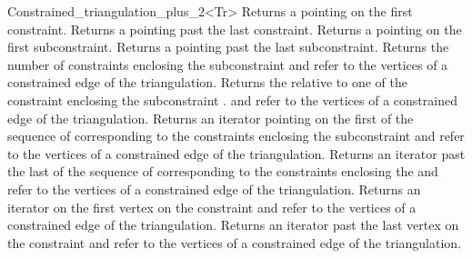 \begin{ccRefClass}{Constrained_triangulation_plus_2<Tr>}
{Returns a  pointing on the first
constraint.}
\ccGlue
{}
{Returns a  pointing past the last
constraint.}
\ccGlue
{}
{Returns a  pointing on the first
subconstraint.}
\ccGlue
{}
{Returns a  pointing past the last
subconstraint.}
\ccGlue
{}
{Returns the number of constraints enclosing the subconstraint
\ccPrecond {} and  refer to  the vertices
of a constrained edge of the triangulation.}
\ccGlue
{}
{Returns the   relative to  one of the constraint 
enclosing  the subconstraint  .
\ccPrecond {} and  refer to  the vertices
of a constrained edge of the triangulation.}
\ccGlue
{}
{Returns an iterator pointing on the first 
of the sequence of 
corresponding to the constraints enclosing the subconstraint
\ccPrecond {} and  refer to  the vertices
of a constrained edge of the triangulation.}
\ccGlue
{}
{Returns an iterator past the last  
of the sequence of 
corresponding to the constraints enclosing the  
\ccPrecond {} and  refer to  the vertices
of a constrained edge of the triangulation.}
\ccGlue
{}
{Returns an iterator on the first vertex on the constraint
\ccPrecond {} and  refer to  the vertices
of a constrained edge of the triangulation.}
\ccGlue
{}
{Returns an iterator past  the last  vertex on  the constraint
\ccPrecond {} and  refer to  the vertices
of a constrained edge of the triangulation.}


\ccSeeAlso
{} \\
 \\
 \\


\end{ccRefClass}
